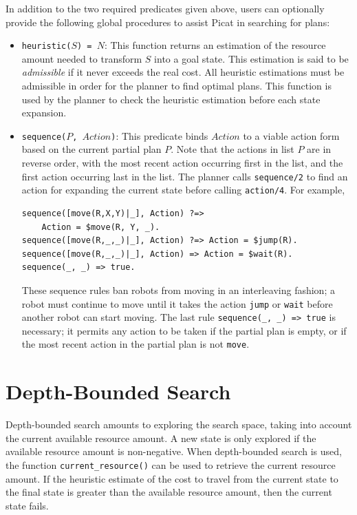 In addition to the two required predicates given above, users can optionally provide the following global procedures to assist Picat in searching for plans:
\begin{itemize}
\item \texttt{heuristic($S$) = $N$}: This function returns an estimation of the resource amount needed to transform $S$ into a goal state. This estimation is said to be \textit{admissible} if it never exceeds the real cost. All heuristic estimations must be admissible in order for the planner to find optimal plans. This function is used by the planner to check the heuristic estimation before each state expansion.

\item \texttt{sequence($P$, $Action$)}: This predicate binds $Action$ to a viable action form based on the current partial plan $P$. Note that the actions in list $P$ are in reverse order, with the most recent action occurring first in the list, and the first action occurring last in the list. The planner calls \texttt{sequence/2} to find an action for expanding the current state before calling \texttt{action/4}. For example,
\begin{verbatim}
sequence([move(R,X,Y)|_], Action) ?=> 
    Action = $move(R, Y, _).
sequence([move(R,_,_)|_], Action) ?=> Action = $jump(R).
sequence([move(R,_,_)|_], Action) => Action = $wait(R).
sequence(_, _) => true.
\end{verbatim}
These sequence rules ban robots from moving in an interleaving fashion; a robot must continue to move until it takes the action \texttt{jump} or \texttt{wait} before another robot can start moving. The last rule \texttt{sequence(\_, \_) => true} is necessary; it permits any action to be taken if the partial plan is empty, or if the most recent action in the partial plan is not \texttt{move}.
\end{itemize}

\section{Depth-Bounded Search}
Depth-bounded search amounts to exploring the search space, taking into account the current available resource amount. A new state is only explored if the available resource amount is non-negative. When depth-bounded search is used, the function {\tt current\_resource()} can be used to retrieve the current resource amount. If the heuristic estimate of the cost to travel from the current state to the final state is greater than the available resource amount, then the current state fails.

